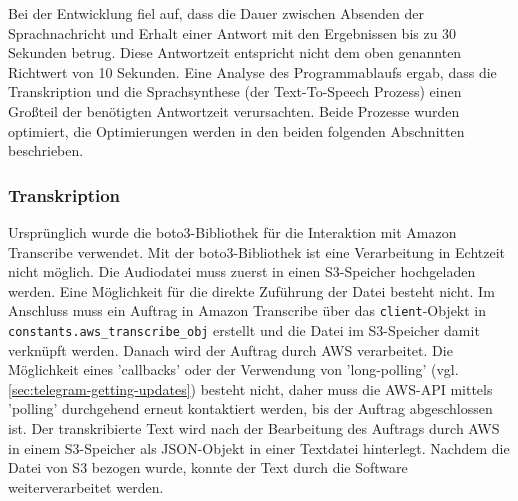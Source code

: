 Bei der Entwicklung fiel auf, dass die Dauer zwischen Absenden der Sprachnachricht und Erhalt einer Antwort mit den Ergebnissen bis zu 30 Sekunden betrug. Diese Antwortzeit entspricht nicht dem oben genannten Richtwert von 10 Sekunden. Eine Analyse des Programmablaufs ergab, dass die Transkription und die Sprachsynthese (der Text-To-Speech Prozess) einen Großteil der benötigten Antwortzeit verursachten. Beide Prozesse wurden optimiert, die Optimierungen werden in den beiden folgenden Abschnitten beschrieben.

\subsubsection{Transkription}
\label{sec:optimierung-transk}

Ursprünglich wurde die boto3-Bibliothek für die Interaktion mit Amazon Transcribe verwendet. Mit der boto3-Bibliothek ist eine Verarbeitung in Echtzeit nicht möglich. Die Audiodatei muss zuerst in einen S3-Speicher hochgeladen werden. Eine Möglichkeit für die direkte Zuführung der Datei besteht nicht. Im Anschluss muss ein Auftrag in Amazon Transcribe über das \lstinline{client}-Objekt in \lstinline{constants.aws_transcribe_obj} erstellt und die Datei im S3-Speicher damit verknüpft werden. Danach wird der Auftrag durch AWS verarbeitet. Die Möglichkeit eines 'callbacks' oder der Verwendung von 'long-polling' (vgl. \autoref{sec:telegram-getting-updates}) besteht nicht, daher muss die AWS-API mittels 'polling' durchgehend erneut kontaktiert werden, bis der Auftrag abgeschlossen ist. Der transkribierte Text wird nach der Bearbeitung des Auftrags durch AWS in einem S3-Speicher als JSON-Objekt in einer Textdatei hinterlegt. Nachdem die Datei von S3 bezogen wurde, konnte der Text durch die Software weiterverarbeitet werden.

